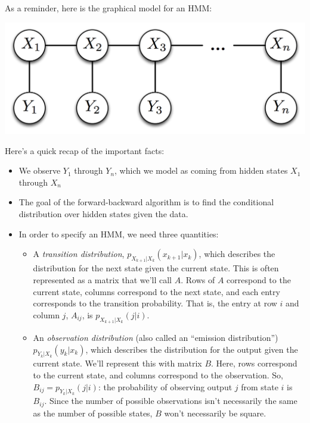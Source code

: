 \documentclass[6008notes.tex]{subfiles}
\begin{document}
As a reminder, here is the graphical model for an HMM:

{\centering\includegraphics[scale=0.4]{images_sec-graphical-models-hmm} \par}

Here's a quick recap of the important facts:

\begin{itemize}
\item We observe $Y_1$ through $Y_n$, which we model as coming from hidden states $X_1$ through $X_n$

\item The goal of the forward-backward algorithm is to find the conditional distribution over hidden states given the data.

\item In order to specify an HMM, we need three quantities:

\begin{itemize}
\item A \textit{transition distribution}, $p_{X_{k+1}|X_ k}(x_{k+1}|x_ k)$, which describes the distribution for the next state given the current state. This is often represented as a matrix that we'll call $A$. Rows of $A$ correspond to the current state, columns correspond to the next state, and each entry corresponds to the transition probability. That is, the entry at row $i$ and column $j$, $A_{ij}$, is $p_{X_{k+1}|X_ k}(j|i)$.

\item An \textit{observation distribution} (also called an ``emission distribution'') $p_{Y_ k|X_ k}(y_ k|x_ k)$, which describes the distribution for the output given the current state. We'll represent this with matrix $B$. Here, rows correspond to the current state, and columns correspond to the observation. So, $B_{ij} = p_{Y_ k|X_ k}(j|i)$: the probability of observing output $j$ from state $i$ is $B_{ij}$. Since the number of possible observations isn't necessarily the same as the number of possible states, $B$ won't necessarily be square.


\end{itemize}
\end{itemize}
\end{document}
